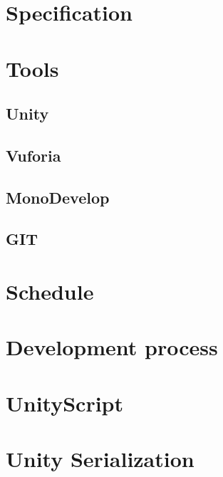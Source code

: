 \documentclass[BSP,english,oneside]{classes/gucthesis}
\begin{document}
	\chapter{Specification}
		\label{chap:specification}
		

	\chapter{Tools}
		\label{chap:tools}

		\section{Unity}
			

		\section{Vuforia}
			

		\section{MonoDevelop}
			

		\section{GIT}
			

	\chapter{Schedule}
		

	\chapter{Development process}
		

	\chapter{UnityScript}
		\label{chap:UnityScript}
		

	\chapter{Unity Serialization}
		\label{chap:UnitySerialization}
		
\end{document}
